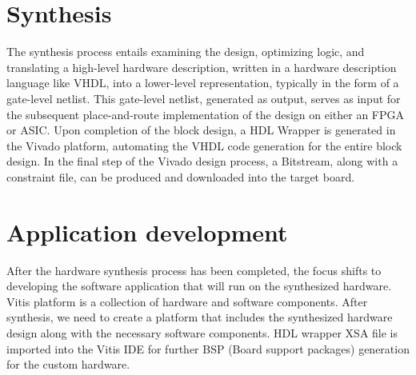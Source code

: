 \section{Synthesis}

The synthesis process entails examining the design, optimizing logic, and translating a high-level hardware description, written in a hardware description language like VHDL, into a lower-level representation, typically in the form of a gate-level netlist. This gate-level netlist, generated as output, serves as input for the subsequent place-and-route implementation of the design on either an FPGA or ASIC.
\vspace{2mm}
Upon completion of the block design, a HDL Wrapper is generated in the Vivado platform, automating the VHDL code generation for the entire block design. In the final step of the Vivado design process, a Bitstream, along with a constraint file, can be produced and downloaded into the target board.

\section{ Application development}

After the hardware synthesis process has been completed, the focus shifts to developing the software application that will run on the synthesized hardware. Vitis platform is a collection of hardware and software components. After synthesis, we need to create a platform that includes the synthesized hardware design along with the necessary software components. HDL wrapper XSA file is imported into the Vitis IDE for further BSP (Board support packages) generation for the custom hardware.
\vspace{2mm}

